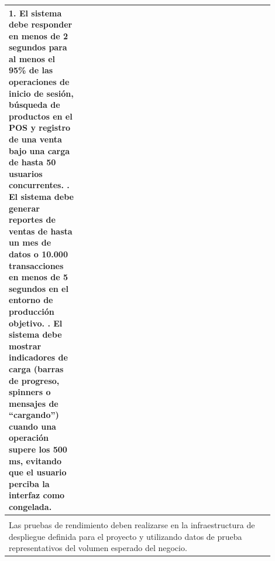 \begin{longtable}{|p{0.25\linewidth}|p{0.15\linewidth}|p{0.15\linewidth}|p{0.35\linewidth}|}
{			1. El sistema debe responder en menos de 2 segundos para al menos el 95\% de las operaciones de inicio de sesión, búsqueda de productos en el POS y registro de una venta bajo una carga de hasta 50 usuarios concurrentes. \newline
			2. El sistema debe generar reportes de ventas de hasta un mes de datos o 10.000 transacciones en menos de 5 segundos en el entorno de producción objetivo. \newline
		3. El sistema debe mostrar indicadores de carga (barras de progreso, spinners o mensajes de ``cargando'') cuando una operación supere los 500 ms, evitando que el usuario perciba la interfaz como congelada.} \\ \hline
		\rowcolor{tableheaderblue}
		\multicolumn{4}{|l|}{\textbf{Restricciones}}                                                                                                                                                                   \\ \hline
		\multicolumn{4}{|p{0.96\linewidth}|}{%
		Las pruebas de rendimiento deben realizarse en la infraestructura de despliegue definida para el proyecto y utilizando datos de prueba representativos del volumen esperado del negocio.}                      \\ \hline
	
\end{longtable}
\endgroup


